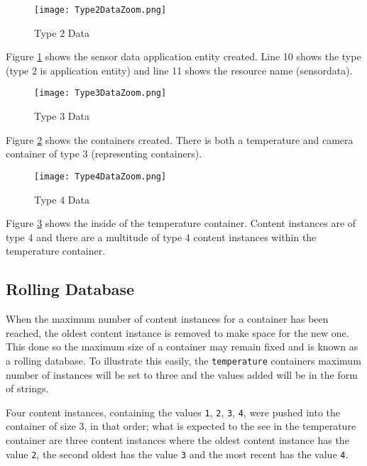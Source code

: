 \begin{figure}[H]
\centering
\texttt{[image: Type2DataZoom.png]}
\caption{Type 2 Data}
\label{fig:Type2Data}
\end{figure}
  
Figure \ref{fig:Type2Data} shows the sensor data application entity created. Line 10 shows the type (type 2 is application entity) and line 11 shows the resource name (sensor\textunderscore data).\\

\begin{figure}[H]
\centering
\texttt{[image: Type3DataZoom.png]}
\caption{Type 3 Data}
\label{fig:Type3Data}
\end{figure}

Figure \ref{fig:Type3Data} shows the containers created. There is both a temperature and camera container of type 3 (representing containers).\\

\begin{figure}[H]
\centering
\texttt{[image: Type4DataZoom.png]}
\caption{Type 4 Data}
\label{fig:Type4Data}
\end{figure}

Figure \ref{fig:Type4Data} shows the inside of the temperature container. Content instances are of type 4 and there are a multitude of type 4 content instances within the temperature container.

\subsection{Rolling Database}

When the maximum number of content instances for a container has been reached, the oldest content instance is removed to make space for the new one. This done so the maximum size of a container may remain fixed and is known as a rolling database. To illustrate this easily, the \lstinline{temperature} containers maximum number of instances will be set to three and the values added will be in the form of strings.

Four content instances, containing the values \lstinline{1}, \lstinline{2}, \lstinline{3}, \lstinline{4}, were pushed into the container of size 3, in that order; what is expected to the see in the temperature container are three content instances where the oldest content instance has the value \lstinline{2}, the second oldest has the value \lstinline{3} and the most recent has the value \lstinline{4}.\\

